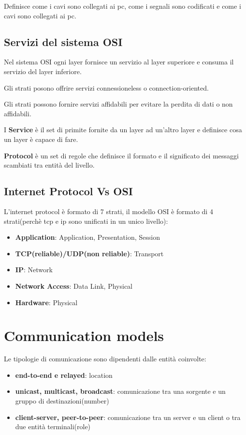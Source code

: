 Definisce come i cavi sono collegati ai pc, come i segnali sono codificati e come i cavi sono collegati ai pc.


\subsection{Servizi del sistema OSI}
Nel sistema OSI ogni layer fornisce un servizio al layer superiore e consuma il servizio del layer inferiore.

Gli strati posono offrire servizi connessioneless o connection-oriented.

Gli strati possono fornire servizi affidabili per evitare la perdita di dati o non affidabili.

I \textbf{Service} è il set di primite fornite da un layer ad un'altro layer e definisce cosa un layer è capace di fare.


\textbf{Protocol} è un set di regole che definisce il formato e il significato dei messaggi scambiati tra entità del livello.

\subsection{Internet Protocol Vs OSI}

L'internet protocol è formato di 7 strati, il modello OSI è formato di 4 strati(perchè tcp e ip sono unificati in un unico livello):
\begin{itemize}
  \item \textbf{Application}: Application, Presentation, Session
  \item \textbf{TCP(reliable)/UDP(non reliable)}: Transport
  \item \textbf{IP}: Network
  \item \textbf{Network Access}: Data Link, Physical
  \item \textbf{Hardware}: Physical
\end{itemize}

\section{Communication models}
Le tipologie di comunicazione sono dipendenti dalle entità coinvolte:
\begin{itemize}
  \item \textbf{end-to-end e relayed}: location
  \item \textbf{unicast, multicast, broadcast}: comunicazione tra una sorgente e un gruppo di destinazioni(number)
  \item \textbf{client-server, peer-to-peer}: comunicazione tra un server e un client o tra due entità terminali(role)
\end{itemize}







